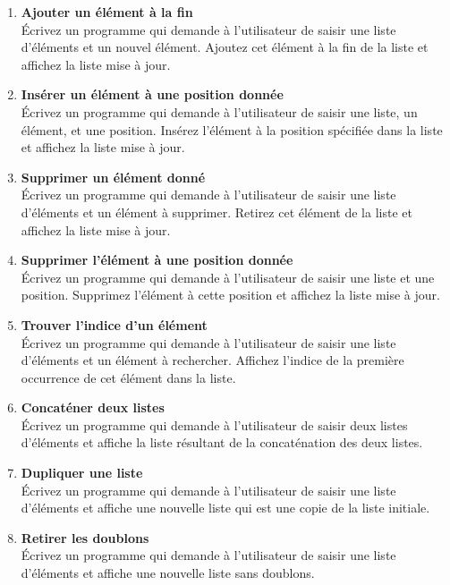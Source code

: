 \begin{enumerate}
    \item \textbf{Ajouter un élément à la fin} \\
    Écrivez un programme qui demande à l'utilisateur de saisir une liste d'éléments et un nouvel élément. Ajoutez cet élément à la fin de la liste et affichez la liste mise à jour.

    \item \textbf{Insérer un élément à une position donnée} \\
    Écrivez un programme qui demande à l'utilisateur de saisir une liste, un élément, et une position. Insérez l'élément à la position spécifiée dans la liste et affichez la liste mise à jour.

    \item \textbf{Supprimer un élément donné} \\
    Écrivez un programme qui demande à l'utilisateur de saisir une liste d'éléments et un élément à supprimer. Retirez cet élément de la liste et affichez la liste mise à jour.

    \item \textbf{Supprimer l'élément à une position donnée} \\
    Écrivez un programme qui demande à l'utilisateur de saisir une liste et une position. Supprimez l'élément à cette position et affichez la liste mise à jour.

    \item \textbf{Trouver l'indice d'un élément} \\
    Écrivez un programme qui demande à l'utilisateur de saisir une liste d'éléments et un élément à rechercher. Affichez l'indice de la première occurrence de cet élément dans la liste.

    \item \textbf{Concaténer deux listes} \\
    Écrivez un programme qui demande à l'utilisateur de saisir deux listes d'éléments et affiche la liste résultant de la concaténation des deux listes.

    \item \textbf{Dupliquer une liste} \\
    Écrivez un programme qui demande à l'utilisateur de saisir une liste d'éléments et affiche une nouvelle liste qui est une copie de la liste initiale.

    \item \textbf{Retirer les doublons} \\
    Écrivez un programme qui demande à l'utilisateur de saisir une liste d'éléments et affiche une nouvelle liste sans doublons.


\end{enumerate}
